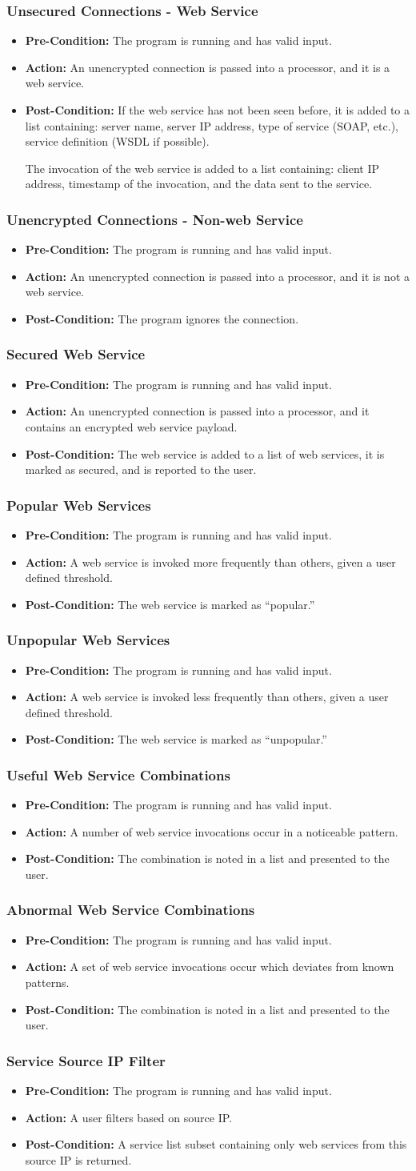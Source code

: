 \documentclass[titlepage]{article}
\newcommand{\testentry}[4]{
    \subsubsection{#1}
    \begin{itemize}
        \item \textbf{Pre-Condition:} #2
        \item \textbf{Action:} #3
        \item \textbf{Post-Condition:} #4
    \end{itemize}
    \vspace{0.5em}
}
\begin{document}
\testentry{Unsecured Connections - Web Service}{
    The program is running and has valid input.
}{
    An unencrypted connection is passed into a processor, and it is a web
    service.
}{
    If the web service has not been seen before, it is added to a list
    containing: server name, server IP address, type of service (SOAP, etc.),
    service definition (WSDL if possible).

    The invocation of the web service is added to a list containing: client IP
    address, timestamp of the invocation, and the data sent to the service.
}

\testentry{Unencrypted Connections - Non-web Service}{
    The program is running and has valid input.
}{
    An unencrypted connection is passed into a processor, and it is not a web
    service.
}{
    The program ignores the connection.
}
    
\testentry{Secured Web Service}{
    The program is running and has valid input.
}{
    An unencrypted connection is passed into a processor, and it contains an
    encrypted web service payload.
}{
    The web service is added to a list of web services, it is marked as secured,
    and is reported to the user.
}

\testentry{Popular Web Services}{
    The program is running and has valid input.
}{
    A web service is invoked more frequently than others, given a user defined
    threshold.
}{
    The web service is marked as ``popular.''
}

\testentry{Unpopular Web Services}{
    The program is running and has valid input.
}{
    A web service is invoked less frequently than others, given a user defined
    threshold.
}{
    The web service is marked as ``unpopular.''
}

\testentry{Useful Web Service Combinations}{
    The program is running and has valid input.
}{
    A number of web service invocations occur in a noticeable pattern.
}{
    The combination is noted in a list and presented to the user.
}

\testentry{Abnormal Web Service Combinations}{
    The program is running and has valid input.
}{
    A set of web service invocations occur which deviates from known patterns.
}{
    The combination is noted in a list and presented to the user.
}

\testentry{Service Source IP Filter}{
    The program is running and has valid input.
}{
    A user filters based on source IP.
}{
    A service list subset containing only web services from this source IP is
    returned.
}
\end{document}
